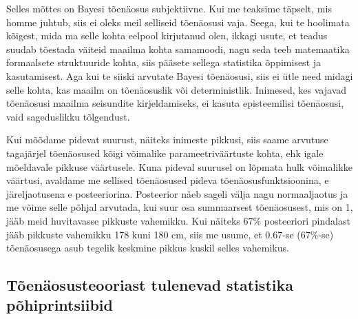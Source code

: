 \documentclass[]{book}
\begin{document}
Selles mõttes on Bayesi tõenäosus subjektiivne. Kui me teaksime täpselt, mis homme juhtub, siis ei oleks meil selliseid tõenäosusi vaja. Seega, kui te hoolimata kõigest, mida ma selle kohta eelpool kirjutanud olen, ikkagi usute, et teadus suudab tõestada väiteid maailma kohta samamoodi, nagu seda teeb matemaatika formaalsete struktuuride kohta, siis pääsete sellega statistika õppimisest ja kasutamisest. Aga kui te siiski arvutate Bayesi tõenäosusi, siis ei ütle need midagi selle kohta, kas maailm on tõenäosuslik või deterministlik. Inimesed, kes vajavad tõenäosusi maailma seisundite kirjeldamiseks, ei kasuta episteemilisi tõenäosusi, vaid sageduslikku tõlgendust.

Kui mõõdame pidevat suurust, näiteks inimeste pikkusi, siis saame arvutuse tagajärjel tõenäosused kõigi võimalike parameetriväärtuste kohta, ehk igale mõeldavale pikkuse väärtusele. Kuna pideval suurusel on lõpmata hulk võimalikke väärtusi, avaldame me sellised tõenäosused pideva tõenäosusfunktsioonina, e järeljaotusena e posteeriorina. Posteerior näeb sageli välja nagu normaaljaotus ja me võime selle põhjal arvutada, kui suur osa summaarsest tõenäosusest, mis on 1, jääb meid huvitavasse pikkuste vahemikku. Kui näiteks 67\% posteeriori pindalast jääb pikkuste vahemikku 178 kuni 180 cm, siis me usume, et 0.67-se (67\%-se) tõenäosusega asub tegelik keskmine pikkus kuskil selles vahemikus.

\hypertarget{toenaosusteooriast-tulenevad-statistika-pohiprintsiibid}{%
\subsection*{Tõenäosusteooriast tulenevad statistika põhiprintsiibid}\label{toenaosusteooriast-tulenevad-statistika-pohiprintsiibid}}
\end{document}
